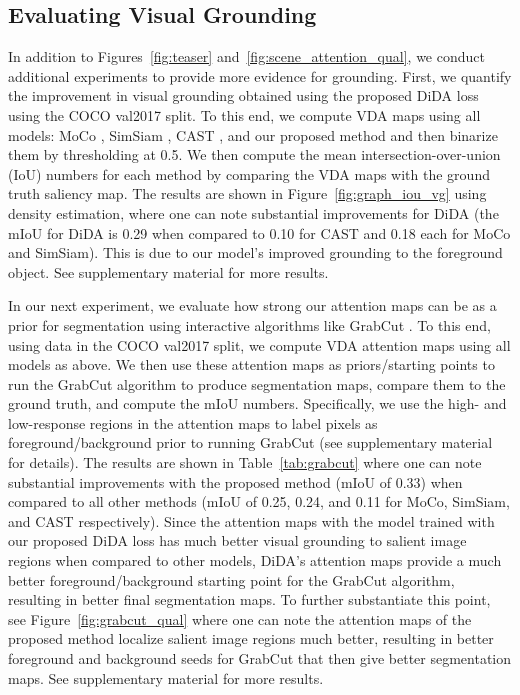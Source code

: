 \documentclass[10pt,twocolumn,letterpaper]{article}
\begin{document}
\subsection{Evaluating Visual Grounding}
In addition to Figures~\ref{fig:teaser} and~\ref{fig:scene_attention_qual}, we conduct additional experiments to provide more evidence for grounding. First, we quantify the improvement in visual grounding obtained using the proposed DiDA loss using the COCO val2017 split. To this end, we compute VDA maps using all models: MoCo \cite{he2020momentum}, SimSiam \cite{chen2020simple}, CAST \cite{selvaraju2021casting}, and our proposed method and then binarize them by thresholding at 0.5. We then compute the mean intersection-over-union (IoU) numbers for each method by comparing the VDA maps with the ground truth saliency map. The results are shown in Figure~\ref{fig:graph_iou_vg} using density estimation, where one can note substantial improvements for DiDA (the mIoU for DiDA is 0.29 when compared to 0.10 for CAST and 0.18 each for MoCo and SimSiam). This is due to our model's improved grounding to the foreground object. See supplementary material for more results.

In our next experiment, we evaluate how strong our attention maps can be as a prior for segmentation using interactive algorithms like GrabCut \cite{rother2004grabcut}. To this end, using data in the COCO val2017 split, we compute VDA attention maps using all models as above. We then use these attention maps as priors/starting points to run the GrabCut algorithm to produce segmentation maps, compare them to the ground truth, and compute the mIoU numbers. Specifically, we use the high- and low-response regions in the attention maps to label pixels as foreground/background prior to running GrabCut (see supplementary material for details). 
The results are shown in Table~\ref{tab:grabcut} where one can note substantial improvements with the proposed method (mIoU of 0.33) when compared to all other methods (mIoU of 0.25, 0.24, and 0.11 for MoCo, SimSiam, and CAST respectively). Since the attention maps with the model trained with our proposed DiDA loss has much better visual grounding to salient image regions when compared to other models, DiDA's attention maps provide a much better foreground/background starting point for the GrabCut algorithm, resulting in better final segmentation maps. To further substantiate this point, see Figure~\ref{fig:grabcut_qual} where one can note the attention maps of the proposed method localize salient image regions much better, resulting in better foreground and background seeds for GrabCut that then give better segmentation maps. See supplementary material for more results. 
\end{document}

